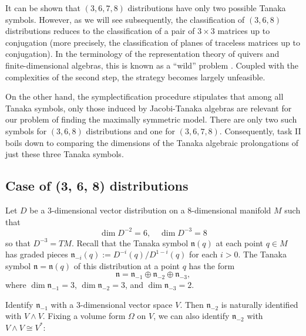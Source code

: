 \documentclass[11pt,letterpaper]{amsart}
\numberwithin{equation}{section}
\begin{document}
It can be shown that $(3,6,7,8)$ distributions have only two possible Tanaka symbols. However, as we will see subsequently, the classification of $(3,6,8)$ distributions reduces to the classification of a pair of $3\times 3$ matrices up to conjugation (more precisely, the classification of planes of traceless matrices up to conjugation). In the terminology of the representation theory of quivers and finite-dimensional algebras, this is known as a ``wild'' problem \cite{Drozd1979, Drozd1980}. Coupled with the complexities of the second step, the strategy becomes largely unfeasible.

On the other hand, the symplectification procedure stipulates that among all Tanaka symbols, only those induced by Jacobi-Tanaka algebras are relevant for our problem of finding the maximally symmetric model. There are only two such symbols for $(3,6,8)$ distributions and one for $(3,6,7,8)$. Consequently, task II boils down to comparing the dimensions of the Tanaka algebraic prolongations of just these three Tanaka symbols.

\subsection{Case of (3, 6, 8) distributions} 
\label{(3,6,8)_subsec}
Let $D$ be a $3$-dimensional vector distribution on a $8$-dimensional manifold $M$ such that
$$\dim D^{-2} = 6, \quad \dim D^{-3} = 8$$
so that $D^{-3} = TM$. Recall that the Tanaka symbol $\mathfrak{n}(q)$ at each point $q \in M$ has graded pieces 
$\mathfrak n_{-i}(q):=D^{-i}(q)/D^{1-i}(q)$ for each $i>0$. The Tanaka symbol $\mathfrak n = \mathfrak n(q)$ of this distribution at a point $q$ has the form
\begin{equation}
    \mathfrak{n} = \mathfrak{n}_{-1} \oplus \mathfrak{n}_{-2} \oplus \mathfrak{n}_{-3},
\end{equation}
where $\dim \mathfrak{n}_{-1} = 3$, $\dim \mathfrak{n}_{-2} = 3$, and $\dim \mathfrak{n}_{-3} = 2$.

Identify $\mathfrak{n}_{-1}$ with a $3$-dimensional vector space $V$. Then $\mathfrak{n}_{-2}$ is naturally identified with $V \wedge V$. Fixing a volume form $\Omega$ on $V$, we can also identify $\mathfrak{n}_{-2}$ with $ V \wedge V \cong V^*$: 
\end{document}

